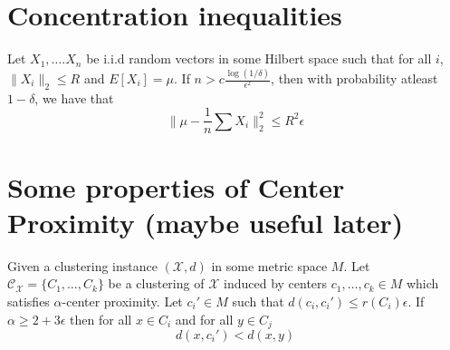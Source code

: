 \documentclass[orivec]{llncs}
\newcommand{\mc}{\mathcal}
\begin{document}
\section{Concentration inequalities}
\label{appendixsection:conIneq}

\begin{theorem}
\label{thm:genHoeff}
Let $X_1, \ldots. X_n$ be i.i.d random vectors in some Hilbert space such that for all $i$, $\|X_i\|_2 \le R$ and $E[X_i] = \mu$. If $n > c\frac{\log(1/\delta)}{\epsilon^2}$, then with probability atleast $1-\delta$, we have that
$$\Big\|\mu - \frac{1}{n}\sum X_i\Big\|_2^2 \le R^2\epsilon$$ 
\end{theorem}

\section{Some properties of Center Proximity (maybe useful later)}
\begin{lemma}
\label{lemma:hasPropertyR}
Given a clustering instance $(\mc X, d)$ in some metric space $M$. Let $\mc C_{\mc X} = \{C_1, \ldots, C_k\}$ be a clustering of $\mc X$ induced by centers $c_1, \ldots, c_k \in M$ which satisfies $\alpha$-center proximity. Let $c_i' \in M$ such that $d(c_i, c_i') \le r(C_i)\epsilon$. If $\alpha \ge 2 + 3\epsilon$ then for all $x \in C_i$ and for all $y \in C_j$
$$d(x, c_i') < d(x, y)$$  
\end{lemma}
\end{document}
